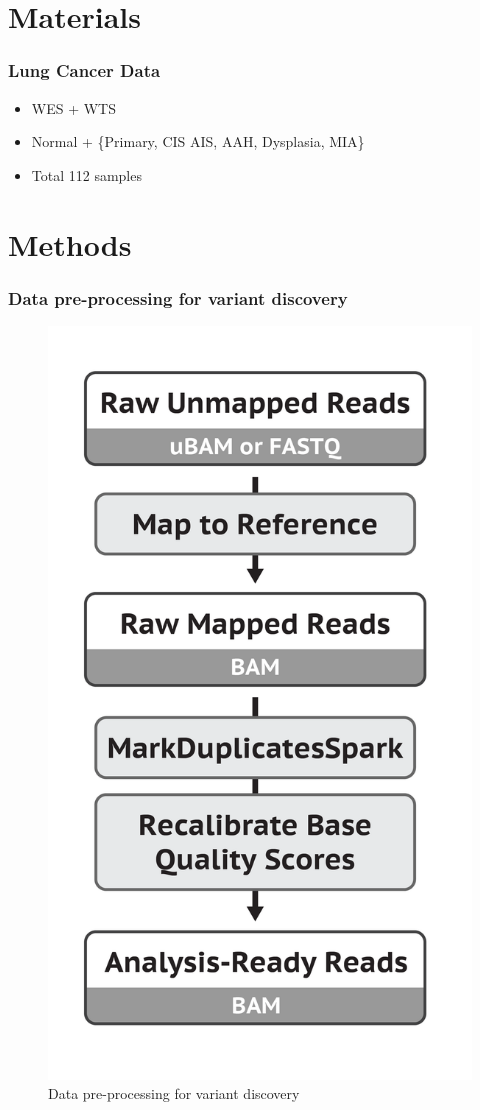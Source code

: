 \documentclass{beamer}
\begin{document}
    \section{Materials}
    \begin{frame}
        \frametitle{Lung Cancer Data}

        \begin{itemize}
            \item WES + WTS
            \item Normal + \{Primary, CIS AIS, AAH, Dysplasia, MIA\}
            \item Total 112 samples
        \end{itemize}
    \end{frame}

    \section{Methods}
    \begin{frame}
        \frametitle{Data pre-processing for variant discovery}

        \begin{figure}
            \includegraphics[width=0.3 \linewidth]{figures/Workflow/mapping.png}
            \caption{Data pre-processing for variant discovery \protect\cite{gatk1, gatk2}}
        \end{figure}
    \end{frame}
\end{document}

